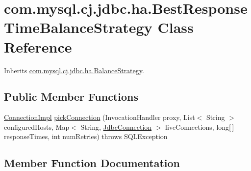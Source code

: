 \hypertarget{classcom_1_1mysql_1_1cj_1_1jdbc_1_1ha_1_1_best_response_time_balance_strategy}{}\section{com.\+mysql.\+cj.\+jdbc.\+ha.\+Best\+Response\+Time\+Balance\+Strategy Class Reference}
\label{classcom_1_1mysql_1_1cj_1_1jdbc_1_1ha_1_1_best_response_time_balance_strategy}


Inherits \mbox{\hyperlink{interfacecom_1_1mysql_1_1cj_1_1jdbc_1_1ha_1_1_balance_strategy}{com.\+mysql.\+cj.\+jdbc.\+ha.\+Balance\+Strategy}}.

\subsection*{Public Member Functions}
\begin{DoxyCompactItemize}
\item 
\mbox{\hyperlink{classcom_1_1mysql_1_1cj_1_1jdbc_1_1_connection_impl}{Connection\+Impl}} \mbox{\hyperlink{classcom_1_1mysql_1_1cj_1_1jdbc_1_1ha_1_1_best_response_time_balance_strategy_a74a8dcc0f838d2df9ff727db02bfe628}{pick\+Connection}} (Invocation\+Handler proxy, List$<$ String $>$ configured\+Hosts, Map$<$ String, \mbox{\hyperlink{interfacecom_1_1mysql_1_1cj_1_1jdbc_1_1_jdbc_connection}{Jdbc\+Connection}} $>$ live\+Connections, long\mbox{[}$\,$\mbox{]} response\+Times, int num\+Retries)  throws S\+Q\+L\+Exception 
\end{DoxyCompactItemize}


\subsection{Member Function Documentation}
\mbox{\label{classcom_1_1mysql_1_1cj_1_1jdbc_1_1ha_1_1_best_response_time_balance_strategy_a74a8dcc0f838d2df9ff727db02bfe628}} 
